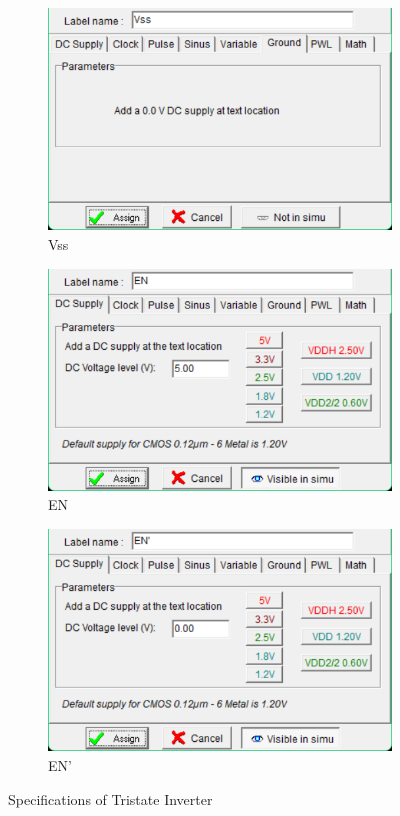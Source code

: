 \documentclass[a4paper,12pt]{article}
\begin{document}
\begin{enumerate}
\begin{figure}[H]
	\begin{subfigure}[t]{0.32\textwidth}
		\centering
		\includegraphics[width=1\linewidth]{images/t/vss}
		\caption{Vss}
	\end{subfigure}
	\hfill
	\begin{subfigure}[t]{0.32\textwidth}
		\centering
		\includegraphics[width=1\linewidth]{images/t/en}
		\caption{EN}
	\end{subfigure}
	\hfill
	\begin{subfigure}[t]{0.32\textwidth}
		\centering
		\includegraphics[width=1\linewidth]{images/t/en'}
		\caption{EN'}
	\end{subfigure}
	\caption{Specifications of Tristate Inverter}
\end{figure}

\end{enumerate}
\end{document}
